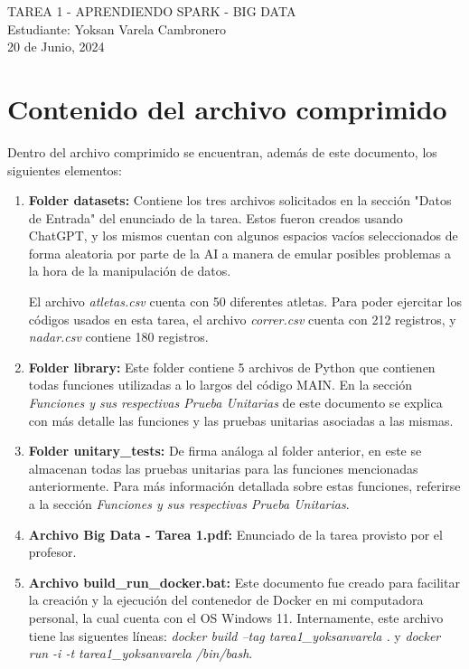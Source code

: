 \documentclass[a4paper]{article}
\begin{document}
\begin{center}
\large{TAREA 1 - APRENDIENDO SPARK - BIG DATA}\\
\small{Estudiante: Yoksan Varela Cambronero}\\
\small{20 de Junio, 2024}
\end{center}

\section{Contenido del archivo comprimido}
Dentro del archivo comprimido se encuentran, adem\'{a}s de este documento, los siguientes elementos:
\begin{enumerate}
    \item \textbf{Folder datasets:} Contiene los tres archivos solicitados en la secci\'{o}n "Datos de Entrada" del enunciado de la tarea. Estos fueron creados usando ChatGPT, y los mismos cuentan con algunos espacios vac\'{i}os seleccionados de forma aleatoria por parte de la AI a manera de emular posibles problemas a la hora de la manipulaci\'{o}n de datos.

    El archivo \textit{atletas.csv} cuenta con 50 diferentes atletas. Para poder ejercitar los c\'{o}digos usados en esta tarea, el archivo \textit{correr.csv} cuenta con 212 registros, y \textit{nadar.csv} contiene 180 registros.
    
    \item \textbf{Folder library:} Este folder contiene 5 archivos de Python que contienen todas funciones utilizadas a lo largos del c\'{o}digo MAIN. En la secci\'{o}n \textit{Funciones y sus respectivas Prueba Unitarias} de este documento se explica con m\'{a}s detalle las funciones y las pruebas unitarias asociadas a las mismas. 
    
    \item \textbf{Folder unitary\_tests:} De firma an\'{a}loga al folder anterior, en este se almacenan todas las pruebas unitarias para las funciones mencionadas anteriormente. Para m\'{a}s informaci\'{o}n detallada sobre estas funciones, referirse a la secci\'{o}n \textit{Funciones y sus respectivas Prueba Unitarias}.
    
    \item \textbf{Archivo Big Data - Tarea 1.pdf:} Enunciado de la tarea provisto por el profesor.
    
    \item \textbf{Archivo build\_run\_docker.bat:} Este documento fue creado para facilitar la creaci\'{o}n y la ejecuci\'{o}n del contenedor de Docker en mi computadora personal, la cual cuenta con el OS Windows 11. Internamente, este archivo tiene las siguentes l\'{i}neas: \textit{ docker build --tag tarea1\_yoksanvarela .} y \textit{ docker run -i -t tarea1\_yoksanvarela /bin/bash}.
    

\end{enumerate}
\end{document}
